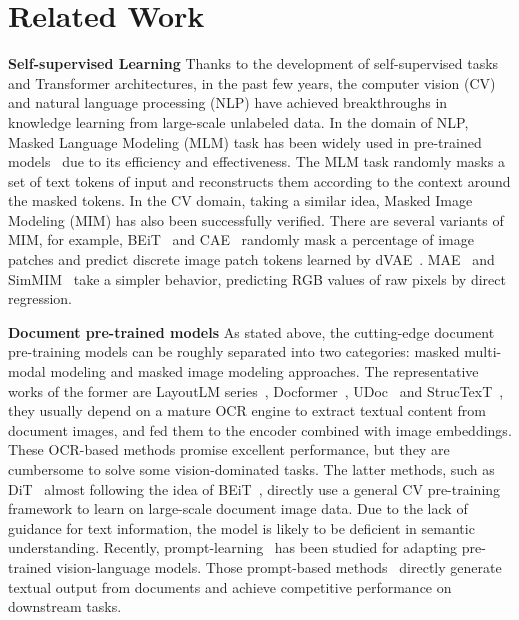 \documentclass{article} \usepackage{iclr2023_conference,times}
\begin{document}
\section{Related Work}
\noindent\textbf{Self-supervised Learning} 
Thanks to the development of self-supervised tasks and Transformer architectures, in the past few years, the computer vision (CV) and natural language processing (NLP) have achieved breakthroughs in knowledge learning from large-scale unlabeled data. In the domain of NLP, Masked Language Modeling (MLM) task has been widely used in pre-trained models~\cite{devlin2018bert,radford2018gpt} due to its efficiency and effectiveness. The MLM task randomly masks a set of text tokens of input and reconstructs them according to the context around the masked tokens. In the CV domain, taking a similar idea, Masked Image Modeling (MIM) has also been successfully verified. There are several variants of MIM, for example, BEiT~\cite{bao2021beit} and CAE~\cite{chen2022context} randomly mask a percentage of image patches and predict discrete image patch tokens learned by dVAE~\cite{ramesh2021dvae}. MAE~\cite{he2021masked} and SimMIM~\cite{Xie00LBYD022} take a simpler behavior, predicting RGB values of raw pixels by direct regression.

\noindent\textbf{Document pre-trained models} 
As stated above, the cutting-edge document pre-training models can be roughly separated into two categories: masked multi-modal modeling and masked image modeling approaches. The representative works of the former are LayoutLM series~\cite{xu2020layoutlm,xu2020layoutlmv2,huang2022layoutlmv3}, Docformer~\cite{appalaraju2021docformer}, UDoc~\cite{nips2021udoc} and StrucTexT~\cite{li2021structext}, they usually depend on a mature OCR engine to extract textual content from document images, and fed them to the encoder combined with image embeddings. These OCR-based methods promise excellent performance, but they are cumbersome to solve some vision-dominated tasks. The latter methods, such as DiT~\cite{li2022dit} almost following the idea of BEiT~\cite{bao2021beit}, directly use a general CV pre-training framework to learn on large-scale document image data. Due to the lack of guidance for text information, the model is likely to be deficient in semantic understanding. Recently, prompt-learning~\cite{LiuYFJHN23} has been studied for adapting pre-trained vision-language models. Those prompt-based methods~\cite{kim2021donut,DavisMPTWM22} directly generate textual output from documents and achieve competitive performance on downstream tasks.
\end{document}
